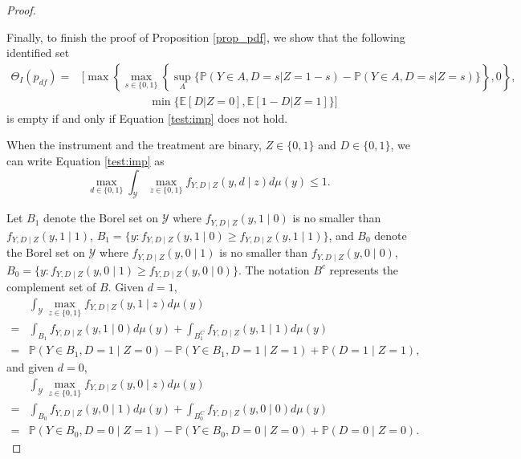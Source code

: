 \documentclass[12pt]{article}
\theoremstyle{plain}
\theoremstyle{definition}
\theoremstyle{remark}
\begin{document}
\begin{proof}
\begin{enumerate}
\end{enumerate}

Finally, to finish the proof of Proposition \ref{prop_pdf}, we show that the following identified set 
\begin{equation} \label{eq:id_bound_df}
    \begin{aligned}
      \Theta_I(p_{df}) =  & \bigg[\max \left\{\max _{s \in\{0,1\}}\left\{\sup _A\{\mathbb{P}(Y \in A, D=s  \vert  Z=1-s)-\mathbb{P}(Y \in A, D=s  \vert  Z=s)\}\right\}, 0\right\}, \\
        & \qquad \qquad \qquad \min \{\mathbb{E}[D  \vert  Z=0], \mathbb{E}[1-D  \vert  Z=1]\}\bigg]
    \end{aligned}
\end{equation}
is empty if and only if Equation \eqref{test:imp} does not hold.

When the instrument and the treatment are binary, $Z \in \{0, 1\}$ and $D \in \{0, 1\}$, we can write Equation \eqref{test:imp} as 
\begin{equation} \label{eq:test_implication}
    \max _{d \in\{0,1\}} \int_{\mathcal{Y}} \max _{z \in \{0,1\}} f_{Y, D \mid Z}(y, d \mid z) d \mu(y) \leq 1.
\end{equation}

Let $B_1$ denote the Borel set on $\mathcal{Y}$ where $f_{Y, D \mid Z}(y, 1 \mid 0)$ is no smaller than $f_{Y, D \mid Z}(y, 1 \mid 1)$, $B_1 = \{y: f_{Y, D \mid Z}(y, 1 \mid 0) \geq f_{Y, D \mid Z}(y, 1 \mid 1)\}$, and $B_0$ denote the Borel set on $\mathcal{Y}$ where $f_{Y, D \mid Z}(y, 0 \mid 1)$ is no smaller than $f_{Y, D \mid Z}(y, 0 \mid 0)$, $B_0 = \{y: f_{Y, D \mid Z}(y, 0 \mid 1) \geq f_{Y, D \mid Z}(y, 0 \mid 0)\}$. The notation $B^c$ represents the complement set of $B$. Given $d = 1$, 
\begin{equation*}
    \begin{aligned}
        &\int_{\mathcal{Y}} \max _{z \in \{0,1\}} f_{Y, D \mid Z}(y, 1 \mid z) d \mu(y) \\
        =& \int_{B_1} f_{Y, D \mid Z}(y, 1 \mid 0) d \mu(y) + \int_{B_1^C} f_{Y, D \mid Z}(y, 1 \mid 1) d \mu(y) \\
        =& \mathbb{P}\left(Y \in B_1, D = 1 \mid Z = 0\right) - \mathbb{P}\left(Y \in B_1, D = 1 \mid Z = 1\right) + \mathbb{P}\left(D = 1 \mid Z = 1\right),
    \end{aligned}
\end{equation*}
and given $d = 0$,
\begin{equation*}
    \begin{aligned}
        &\int_{\mathcal{Y}} \max _{z \in \{0,1\}} f_{Y, D \mid Z}(y, 0 \mid z) d \mu(y) \\
        =& \int_{B_0} f_{Y, D \mid Z}(y, 0 \mid 1) d \mu(y) + \int_{B_0^C} f_{Y, D \mid Z}(y, 0 \mid 0) d \mu(y) \\
        =& \mathbb{P}\left(Y \in B_0, D = 0 \mid Z = 1\right) - \mathbb{P}\left(Y \in B_0, D = 0 \mid Z = 0\right) + \mathbb{P}\left(D = 0 \mid Z = 0\right).
    \end{aligned}
\end{equation*}


\end{proof}
\end{document}
